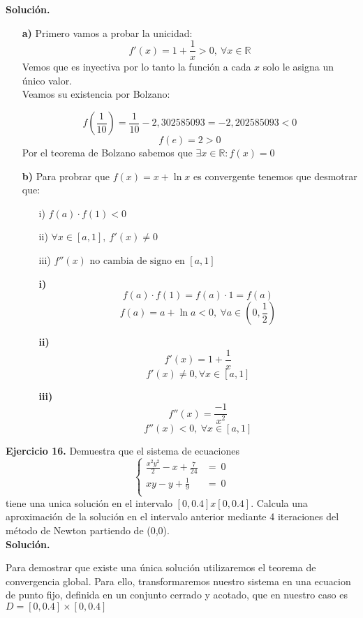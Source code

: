 \documentclass[11pt]{article}
\begin{document}
\textbf{Soluci\'on.}
\begin{itemize}
\item[\textbf{a)}]
Primero vamos a probar la unicidad:
$$f'(x) = 1 + \frac{1}{x} > 0 ,\ \forall x \in \mathbb{R} $$
Vemos que es inyectiva por lo tanto la funci\'on a cada $x$ solo le asigna un \'unico valor. \\
Veamos su existencia por Bolzano:

$$f(\frac{1}{10}) = \frac{1}{10} - 2,302585093 = - 2,202585093 < 0$$
$$f(e) = 2 > 0$$
Por el teorema de Bolzano sabemos que $\exists x \in \mathbb{R} : f(x) = 0$
\item[\textbf{b)}]
Para probrar que $f(x) = x + \ln x$ es convergente tenemos que desmotrar que:
\begin{itemize}
\item[i)]$f(a) \cdot f(1) < 0$
\item[ii)]$\forall x \in [a,1], \ f'(x) \neq 0 $
\item[iii)]$f''(x) \text{ no cambia de signo en } [a,1] $
\end{itemize}

\begin{itemize}
\item[\textbf{i)}]
$$f(a) \cdot f(1) = f(a) \cdot 1 = f(a) $$
$$f(a) = a + \ln a < 0 , \  \forall a \in (0, \frac{1}{2}) $$
\item[\textbf{ii)}]
$$f'(x) = 1 + \frac{1}{x} $$
$$f'(x) \neq 0 , \forall x \in [a,1] $$
\item[\textbf{iii)}]
$$f''(x) = \frac{-1}{x^2} $$
$$f''(x) < 0 , \ \forall x \in [a,1] $$
\end{itemize}
\end{itemize}

\textbf{Ejercicio 16.}
Demuestra que el sistema de ecuaciones
$$\begin{cases}
\frac{x^2y^2}{2} - x + \frac{7}{24} &= \ 0 \\
xy - y + \frac{1}{9} &= \ 0\\
\end{cases}$$
tiene una unica soluci\'on en el intervalo $[0, 0.4]x[0, 0.4]$. Calcula una aproximaci\'on de la soluci\'on en el intervalo anterior mediante 4 iteraciones del m\'etodo de Newton partiendo de (0,0).
\\

\textbf{Solución.}

Para demostrar que existe una única solución utilizaremos el teorema de
convergencia global. Para ello, transformaremos nuestro sistema en una ecuacion
de punto fijo, definida en un conjunto cerrado y acotado, que en nuestro caso
es $D = [0,0.4]\times[0,0.4]$
\end{document}
